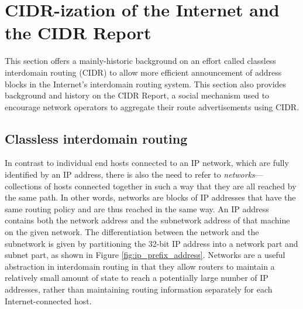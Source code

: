 %
%
%

\section{CIDR-ization of the Internet and the CIDR Report}

This section offers a mainly-historic background on an effort called classless
interdomain routing (CIDR) to allow more efficient announcement of address
blocks in the Internet's interdomain routing system. This section also provides
background and history on the CIDR Report, a social mechanism used to encourage
network operators to aggregate their route advertisements using CIDR.

\subsection{Classless interdomain routing}

In contrast to individual end hosts connected to an IP network, which are fully
identified by an IP address, there is also the need to refer to
\emph{networks}---collections of hosts connected together in such a way that
they are all reached by the same path. In other words, networks are blocks of
IP addresses that have the same routing policy and are thus reached in the same
way. An IP address contains both the network address and the subnetwork address
of that machine on the given network. The differentiation between the network
and the subnetwork is given by partitioning the 32-bit IP address into a
network part and subnet part, as shown in Figure \ref{fig:ip_prefix_address}.
Networks are a useful abstraction in interdomain routing in that they allow
routers to maintain a relatively small amount of state to reach a potentially
large number of IP addresses, rather than maintaining routing information
separately for each Internet-connected host.


